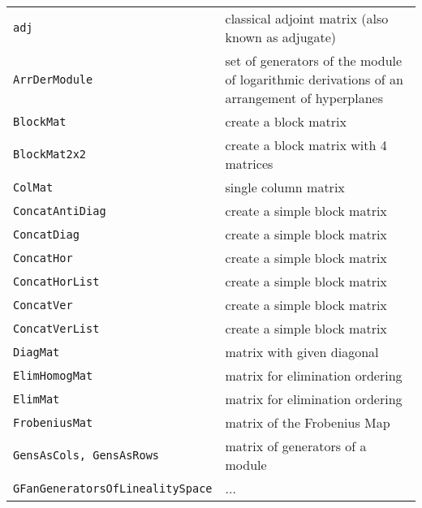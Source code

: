 \documentclass[a4paper]{mybook}
\begin{document}
\begin{center}
\begin{longtable}{ll}
   
{\verb~adj~} &
      classical adjoint matrix (also known as adjugate)\\
   
{\verb~ArrDerModule~} &
      set of generators of the module of logarithmic derivations of an arrangement of hyperplanes\\
   
{\verb~BlockMat~} &
      create a block matrix\\
   
{\verb~BlockMat2x2~} &
      create a block matrix with 4 matrices\\
   
{\verb~ColMat~} &
      single column matrix\\
   
{\verb~ConcatAntiDiag~} &
      create a simple block matrix\\
   
{\verb~ConcatDiag~} &
      create a simple block matrix\\
   
{\verb~ConcatHor~} &
      create a simple block matrix\\
   
{\verb~ConcatHorList~} &
      create a simple block matrix\\
   
{\verb~ConcatVer~} &
      create a simple block matrix\\
   
{\verb~ConcatVerList~} &
      create a simple block matrix\\
   
{\verb~DiagMat~} &
      matrix with given diagonal\\
   
{\verb~ElimHomogMat~} &
      matrix for elimination ordering\\
   
{\verb~ElimMat~} &
      matrix for elimination ordering\\
   
{\verb~FrobeniusMat~} &
      matrix of the Frobenius Map\\
   
{\verb~GensAsCols, GensAsRows~} &
      matrix of generators of a module\\
   
{\verb~GFanGeneratorsOfLinealitySpace~} &
      ...\\
   

\end{longtable}
\end{center}
\end{document}
